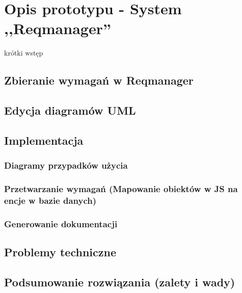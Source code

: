 \chapter{Opis prototypu - System ,,Reqmanager''}
  
  krótki wstęp

  \section{Zbieranie wymagań w Reqmanager}
  \section{Edycja diagramów UML}
  
  \section{Implementacja}

    \subsection{Diagramy przypadków użycia}
    \subsection{Przetwarzanie wymagań (Mapowanie obiektów w JS na encje w bazie danych)}
    \subsection{Generowanie dokumentacji}

  \section{Problemy techniczne}
  \section{Podsumowanie rozwiązania (zalety i wady)}


